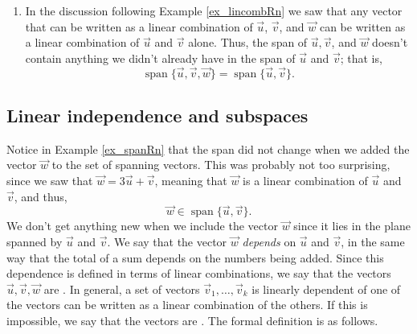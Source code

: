 {\begin{enumerate}
To see that $\operatorname{span}\{\vec{u},\vec{v}\}$ is indeed a plane, we compute
\[
\vec{n} = \vec{u}\times\vec{v} = \bbm -21\\-18\\8\ebm,
\]
which we know is orthogonal to both $\vec{u}$ and $\vec{v}$. It follows from the properties of the dot product that for any other vector $\vec{x}=s\vec{u}+t\vec{v}$ we have
\[
\dotp nx = \vec{n}\boldsymbol{\cdot}(s\vec{u}+t\vec{v}) = s(\dotp ns) + t(\dotp nv) = s(0)+t(0)=0,
\]
so with $\vec{x} = \bbm x\\y\\z\ebm$, we have
\[
-21x-18y+8z=0,
\]
which is the equation of a plane through the origin.

\item In the discussion following Example \ref{ex_lincombRn} we saw that any vector that can be written as a linear combination of $\vec{u}$, $\vec{v}$, and $\vec{w}$ can be written as a linear combination of $\vec{u}$ and $\vec{v}$ alone. Thus, the span of $\vec{u}, \vec{v}$,  and $\vec{w}$ doesn't contain anything we didn't already have in the span of $\vec{u}$ and $\vec{v}$; that is,
\[
\operatorname{span}\{\vec{u},\vec{v},\vec{w}\}=\operatorname{span}\{\vec{u},\vec{v}\}.
\]
\end{enumerate}

\baselineskip
}

\medskip


\subsection*{Linear independence and subspaces}
Notice in Example \ref{ex_spanRn} that the span did not change when we added the vector $\vec{w}$ to the set of spanning vectors. This was probably not too surprising, since we saw that $\vec{w} = 3\vec{u}+\vec{v}$, meaning that $\vec{w}$ is a linear combination of $\vec{u}$ and $\vec{v}$, and thus,
\[
\vec{w}\in\operatorname{span}\{\vec{u},\vec{v}\}.
\]
We don't get anything new when we include the vector $\vec{w}$ since it lies in the plane spanned by $\vec{u}$ and $\vec{v}$. We say that the vector $\vec{w}$ \textit{depends} on $\vec{u}$ and $\vec{v}$, in the same way that the total of a sum depends on the numbers being added. Since this dependence is defined in terms of linear combinations, we say that the vectors $\vec{u},\vec{v},\vec{w}$ are . In general, a set of vectors $\vec{v}_1,\ldots, \vec{v}_k$ is linearly dependent of one of the vectors can be written as a linear combination of the others. If this is impossible, we say that the vectors are . The formal definition is as follows.

